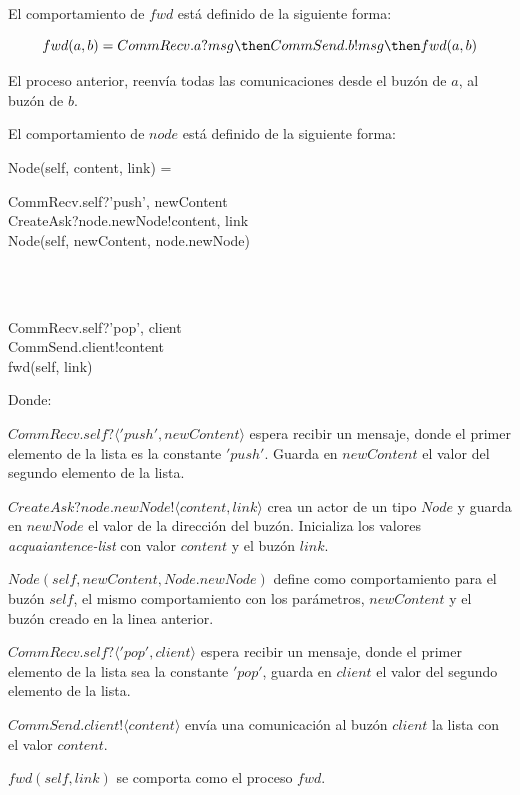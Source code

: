 El comportamiento de $fwd$ está definido de la siguiente forma:

\[
  fwd(a, b) = CommRecv.a?msg \then CommSend.b!msg \then fwd(a, b)
\]

El proceso anterior, reenvía todas las comunicaciones desde el buzón de $a$, al buzón de $b$.

El comportamiento de $node$ está definido de la siguiente forma:

\begin{process}
Node(self, content, link) = {} \\ \quad
\begin{block}
CommRecv.self?\langle 'push', newContent \rangle \then \\
CreateAsk?node.newNode!\langle content, link \rangle \then \\
Node(self, newContent, node.newNode)
\end{block} \\
\Extchoice \\ \quad
\begin{block}
CommRecv.self?\langle 'pop', client \rangle \then  \\
CommSend.client!\langle content \rangle \then  \\
fwd(self, link)
\end{block}

\end{process}

Donde:

\begin{description}
 \item $CommRecv.self?\langle 'push', newContent \rangle$ espera recibir un mensaje, donde el primer elemento de la lista es la constante $'push'$. Guarda en $newContent$ el valor del segundo elemento de la lista.
 \item $CreateAsk?node.newNode!\langle content, link \rangle$ crea un actor de un tipo $Node$ y guarda en $newNode$ el valor de la dirección del buzón. Inicializa los valores \textit{acquaiantence-list} con valor $content$ y el buzón $link$.
 \item $Node(self, newContent, Node.newNode)$ define como comportamiento para el buzón $self$, el mismo comportamiento con los parámetros, $newContent$ y el buzón creado en la linea anterior.
 \item $CommRecv.self?\langle 'pop', client \rangle$ espera recibir un mensaje, donde el primer elemento de la lista sea la constante $'pop'$, guarda en $client$ el valor del segundo elemento de la lista.
 \item $CommSend.client!\langle content \rangle$ envía una comunicación al buzón $client$ la lista con el valor $content$.
 \item $fwd(self, link)$ se comporta como el proceso $fwd$.
\end{description}

